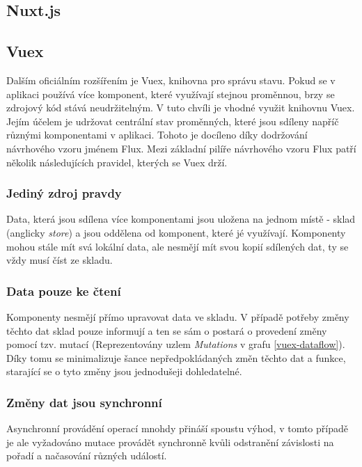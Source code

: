 \subsection{Nuxt.js}
\blindtext

\subsection{Vuex}
Dalším oficiálním rozšířením je Vuex, knihovna pro správu stavu. Pokud se v aplikaci používá více komponent, které využívají stejnou proměnnou, brzy se zdrojový kód stává neudržitelným. 
V tuto chvíli je vhodné využit knihovnu Vuex. Jejím účelem je udržovat centrální stav proměnných, které jsou sdíleny napříč různými komponentami v aplikaci. Tohoto je docíleno díky dodržování návrhového vzoru jménem Flux. Mezi základní pilíře návrhového vzoru Flux patří několik následujících pravidel, kterých se Vuex drží. 


\subsubsection*{Jediný zdroj pravdy}
Data, která jsou sdílena více komponentami jsou uložena na jednom místě - sklad (anglicky \emph{store}) a jsou oddělena od komponent, které jé využívají. Komponenty mohou stále mít svá lokální data, ale nesmějí mít svou kopií sdílených dat, ty se vždy musí číst ze skladu.

\subsubsection*{Data pouze ke čtení}
Komponenty nesmějí přímo upravovat data ve skladu. V případě potřeby změny těchto dat sklad pouze informují a ten se sám o postará o provedení změny pomocí tzv. mutací (Reprezentovány uzlem \emph{Mutations} v grafu \ref{vuex-dataflow}). Díky tomu se minimalizuje šance nepředpokládaných změn těchto dat a funkce, starající se o tyto změny jsou jednodušeji dohledatelné.


\subsubsection*{Změny dat jsou synchronní}
Asynchronní provádění operací mnohdy přináší spoustu výhod, v tomto případě je ale vyžadováno mutace provádět synchronně kvůli odstranění závislosti na pořadí a načasování různých událostí.


